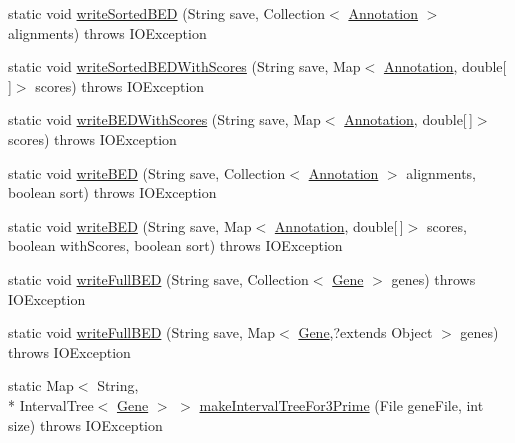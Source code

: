 \begin{DoxyCompactItemize}
\item 
static void \hyperlink{classbroad_1_1pda_1_1annotation_1_1_b_e_d_file_parser_ae1b3b11069e1114a7bbe7e4224baa843}{write\+Sorted\+B\+E\+D} (String save, Collection$<$ \hyperlink{interfaceumms_1_1core_1_1annotation_1_1_annotation}{Annotation} $>$ alignments)  throws I\+O\+Exception 
\item 
static void \hyperlink{classbroad_1_1pda_1_1annotation_1_1_b_e_d_file_parser_abeff457ac282ba0590f5620ad1792cbf}{write\+Sorted\+B\+E\+D\+With\+Scores} (String save, Map$<$ \hyperlink{interfaceumms_1_1core_1_1annotation_1_1_annotation}{Annotation}, double\mbox{[}$\,$\mbox{]}$>$ scores)  throws I\+O\+Exception 
\item 
static void \hyperlink{classbroad_1_1pda_1_1annotation_1_1_b_e_d_file_parser_aa66d2512340022f9ab988b36dfe25623}{write\+B\+E\+D\+With\+Scores} (String save, Map$<$ \hyperlink{interfaceumms_1_1core_1_1annotation_1_1_annotation}{Annotation}, double\mbox{[}$\,$\mbox{]}$>$ scores)  throws I\+O\+Exception
\item 
static void \hyperlink{classbroad_1_1pda_1_1annotation_1_1_b_e_d_file_parser_afeb570e01ae5a2989e187e66fc56f324}{write\+B\+E\+D} (String save, Collection$<$ \hyperlink{interfaceumms_1_1core_1_1annotation_1_1_annotation}{Annotation} $>$ alignments, boolean sort)  throws I\+O\+Exception
\item 
static void \hyperlink{classbroad_1_1pda_1_1annotation_1_1_b_e_d_file_parser_a3df685adf26688b983a2838c3614b800}{write\+B\+E\+D} (String save, Map$<$ \hyperlink{interfaceumms_1_1core_1_1annotation_1_1_annotation}{Annotation}, double\mbox{[}$\,$\mbox{]}$>$ scores, boolean with\+Scores, boolean sort)  throws I\+O\+Exception
\item 
static void \hyperlink{classbroad_1_1pda_1_1annotation_1_1_b_e_d_file_parser_a97dc56bf7a65a961736353f4c7d74d9f}{write\+Full\+B\+E\+D} (String save, Collection$<$ \hyperlink{classumms_1_1core_1_1annotation_1_1_gene}{Gene} $>$ genes)  throws I\+O\+Exception
\item 
static void \hyperlink{classbroad_1_1pda_1_1annotation_1_1_b_e_d_file_parser_a89d336bdc725ce61fa7d57546b337f52}{write\+Full\+B\+E\+D} (String save, Map$<$ \hyperlink{classumms_1_1core_1_1annotation_1_1_gene}{Gene},?extends Object $>$ genes)  throws I\+O\+Exception
\item 
static Map$<$ String, \\*
Interval\+Tree$<$ \hyperlink{classumms_1_1core_1_1annotation_1_1_gene}{Gene} $>$ $>$ \hyperlink{classbroad_1_1pda_1_1annotation_1_1_b_e_d_file_parser_ac9a4b9c9231f57edaad2c6dc33107d0d}{make\+Interval\+Tree\+For3\+Prime} (File gene\+File, int size)  throws I\+O\+Exception 

\end{DoxyCompactItemize}
